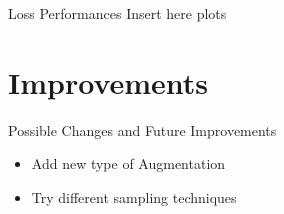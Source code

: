\documentclass{beamer}
\begin{document}
\begin{frame}{Loss Performances}
Insert here plots
\end{frame}

\section{Improvements}

\begin{frame}{Possible Changes and Future Improvements}
  \begin{itemize}
    \item Add new type of Augmentation
    \item Try different sampling techniques
  \end{itemize}
\end{frame}

\backmatter
\end{document}
